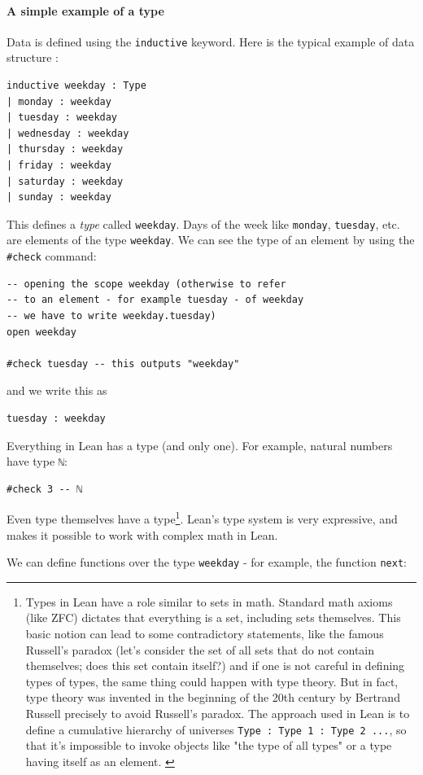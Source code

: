 \documentclass{book}
\theoremstyle{definition}
\theoremstyle{remark}
\theoremstyle{plain}
\begin{document}
\paragraph{A simple example of a type}
Data is defined using the \lstinline{inductive} keyword.
Here is the typical example of data structure \cite{theoremprovinglean}:
\begin{lstlisting}
inductive weekday : Type
| monday : weekday
| tuesday : weekday
| wednesday : weekday
| thursday : weekday
| friday : weekday
| saturday : weekday
| sunday : weekday
\end{lstlisting}
This defines a \textit{type} called \lstinline{weekday}.
Days of the week like \lstinline{monday}, \lstinline{tuesday}, etc. are elements of the type \lstinline{weekday}.
We can see the type of an element by using the \lstinline{#check} command:
\begin{lstlisting}
-- opening the scope weekday (otherwise to refer
-- to an element - for example tuesday - of weekday
-- we have to write weekday.tuesday)
open weekday

#check tuesday -- this outputs "weekday"
\end{lstlisting}
and we write this as
\begin{lstlisting}
tuesday : weekday
\end{lstlisting}
Everything in Lean has a type (and only one). For example, natural numbers have type \lstinline{ℕ}:
\begin{lstlisting}
#check 3 -- ℕ
\end{lstlisting}
Even type themselves have a type\footnote{Types in Lean have a role similar to sets in math.
Standard math axioms (like ZFC) dictates that everything is a set, including sets themselves.
This basic notion can lead to some contradictory statements, like the famous Russell's paradox
(let's consider the set of all sets that do not contain themselves; does this set contain itself?)
and if one is not careful in defining types of types, the same thing could happen with type theory.
But in fact, type theory was invented in the beginning of the 20th century by Bertrand Russell precisely to avoid Russell's paradox.
The approach used in Lean is to define a cumulative hierarchy of universes \lstinline{Type : Type 1 : Type 2 ...},
so that it's impossible to invoke objects like "the type of all types" or a type having itself as an element. \cite{CarneiroMaster}}.
Lean's type system is very expressive, and makes it possible to work with complex math in Lean.

We can define functions over the type \lstinline{weekday} -
for example, the function \lstinline{next}:
\end{document}

